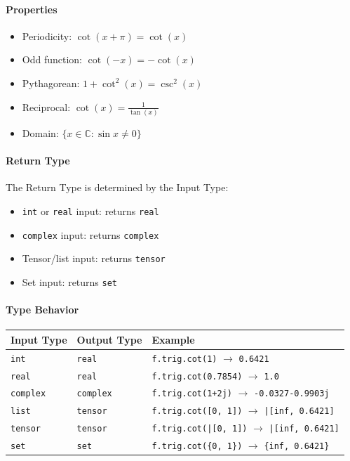 \paragraph{Properties}
\begin{itemize}
\item Periodicity: $\cot(x + \pi) = \cot(x)$
\item Odd function: $\cot(-x) = -\cot(x)$
\item Pythagorean: $1 + \cot^2(x) = \csc^2(x)$
\item Reciprocal: $\cot(x) = \frac{1}{\tan(x)}$
\item Domain: $\{x \in \mathbb{C} : \sin x \neq 0\}$
\end{itemize}

\paragraph{Return Type}
The Return Type is determined by the Input Type:
\begin{itemize}
\item \texttt{int} or \texttt{real} input: returns \texttt{real}
\item \texttt{complex} input: returns \texttt{complex}
\item Tensor/list input: returns \texttt{tensor}
\item Set input: returns \texttt{set}
\end{itemize}

\paragraph{Type Behavior}
\begin{center}
\begin{tabular}{lll}
\textbf{Input Type} & \textbf{Output Type} & \textbf{Example} \\ \hline
\texttt{int} & \texttt{real} & \texttt{f.trig.cot(1)} $\to$ \texttt{0.6421} \\
\texttt{real} & \texttt{real} & \texttt{f.trig.cot(0.7854)} $\to$ \texttt{1.0} \\
\texttt{complex} & \texttt{complex} & \texttt{f.trig.cot(1+2j)} $\to$ \texttt{-0.0327-0.9903j} \\
\texttt{list} & \texttt{tensor} & \texttt{f.trig.cot([0, 1])} $\to$ \texttt{|[inf, 0.6421]} \\
\texttt{tensor} & \texttt{tensor} & \texttt{f.trig.cot(|[0, 1])} $\to$ \texttt{|[inf, 0.6421]} \\
\texttt{set} & \texttt{set} & \texttt{f.trig.cot(\{0, 1\})} $\to$ \texttt{\{inf, 0.6421\}} \\
\end{tabular}
\end{center}

